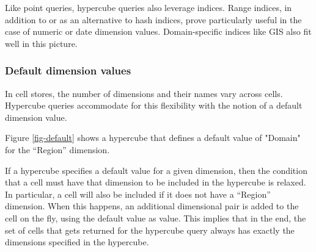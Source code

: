 \documentclass{vldb}
\begin{document}
Like point queries, hypercube queries also leverage indices. Range indices, in addition to or as an alternative to hash indices, prove particularly useful in the case of numeric or date dimension values. Domain-specific indices like GIS also fit well in this picture.

\subsubsection{Default dimension values}

In cell stores, the number of dimensions and their names vary across cells. Hypercube queries accommodate for this flexibility with the notion of a default dimension value.

Figure \ref{fig-default} shows a hypercube that defines a default value of "Domain" for the ``Region'' dimension.

If a hypercube specifies a default value for a given dimension, then the condition that a cell must have that dimension to be included in the hypercube is relaxed. In particular, a cell will also be included if it does not have a ``Region'' dimension. When this happens, an additional dimensional pair is added to the cell on the fly, using the default value as value. This implies that in the end, the set of cells that gets returned for the hypercube query always has exactly the dimensions specified in the hypercube.
\end{document}
